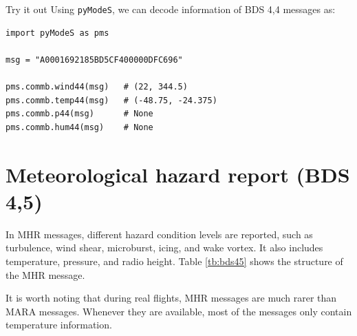 \begin{notebox}{Try it out}
Using \texttt{pyModeS}, we can decode information of BDS 4,4 messages as: 

\begin{verbatim}
import pyModeS as pms

msg = "A0001692185BD5CF400000DFC696"

pms.commb.wind44(msg)   # (22, 344.5)
pms.commb.temp44(msg)   # (-48.75, -24.375)
pms.commb.p44(msg)      # None
pms.commb.hum44(msg)    # None
\end{verbatim}

\end{notebox}

\clearpage
\section{Meteorological hazard report (BDS 4,5)}

In MHR messages, different hazard condition levels are reported, such as turbulence, wind shear, microburst, icing, and wake vortex. It also includes temperature, pressure, and radio height. Table \ref{tb:bds45} shows the structure of the MHR message.

It is worth noting that during real flights, MHR messages are much rarer than MARA messages. Whenever they are available, most of the messages only contain temperature information.

